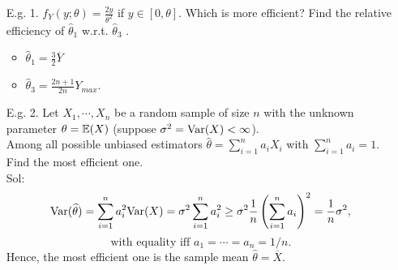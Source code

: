 \begin{frame}
 \begin{enumerate}
  \item[E.g. 1.] $f_Y(y;\theta)=\frac{2y}{\theta^2}$ if $y\in [0,\theta]$. Which is more efficient? Find the relative efficiency of $\widehat{\theta}_1$ w.r.t. $\widehat{\theta}_3$ .
 \begin{itemize}
  \item $\displaystyle\hat{\theta}_1=\frac{3}{2}\overline{Y}$ \\[1em]
  \item $\displaystyle\hat{\theta}_3=\frac{2n+1}{2n}Y_{max}$.
 \end{itemize}
 \vfill
 \item[E.g. 2.] Let $X_1,\cdots,X_n$ be a random sample of size $n$ with the unknown parameter $\theta=\mathbb{E}(X)$
	 (suppose $\sigma^2 = \text{Var}(X)<\infty$).\\[1em]
	 \pause
	 Among all possible unbiased estimators $\hat{\theta}=\sum_{i=1}^n a_i X_i$ with $\sum_{i=1}^n a_i=1$.
	 Find the most efficient one.\\[1em]\pause
	 Sol:
 \[
 \text{Var}(\widehat{\theta}) = \sum_{i=1}^n a_i^2 \text{Var}(X) =\sigma^2  \sum_{i=1}^n a_i^2
 \ge \sigma^2 \frac{1}{n} \left(\sum_{i=1}^n a_i\right)^2 = \frac{1}{n} \sigma^2,
 \]
 \[
 \text{with equality iff $a_1=\cdots=a_n=1/n$.}
 \]
 Hence, the most efficient one is the sample mean $\widehat\theta= \overline{X}$.
 \myEnd
 \end{enumerate}

\end{frame}
